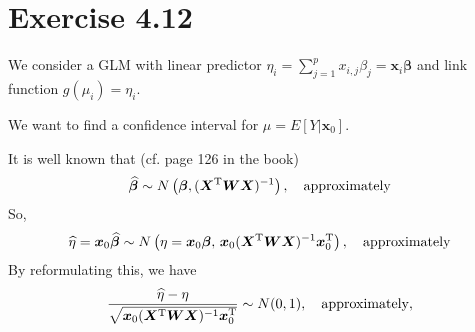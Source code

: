 \documentclass[a4paper]{article}
\begin{document}
\vspace{\baselineskip}
\section{Exercise 4.12}

We consider a GLM  with linear predictor $\eta_i =\sum_{j=1}^{p} x_{i,j} \beta_{j} =\bm{x}_{i} \bm{\beta}$ and link function $g(\mu_{i})=\eta_{i}$.

We want to find a confidence interval for $\mu=E[Y|\bm{x}_0]$.

It is well known that (cf. page 126 in the book)
\begin{align*}
\widehat{\bm{\beta}} \sim N\left(\bm{\beta}, (\bm{X}^{\rm T}\bm{W}\bm{X})^{-1} \right),\quad \mbox{approximately}
\end{align*}
So,
\begin{align*}
\widehat{\eta} = \bm{x}_{0}\widehat{\bm{\beta}} \sim N\left(\eta = \bm{x}_{0}\bm{\beta}, \, \bm{x}_{0}(\bm{X}^{\rm T}\bm{W}\bm{X})^{-1}\bm{x}_{0}^{\rm T} \right),\quad \mbox{approximately}
\end{align*}
By reformulating this, we have
\begin{align*}
\frac{\widehat{\eta}-\eta}{\sqrt{\bm{x}_{0}(\bm{X}^{\rm T}\bm{W}\bm{X})^{-1}\bm{x}_{0}^{\rm T}}} \sim N(0,1), \quad \mbox{approximately},
\end{align*}
\end{document}
